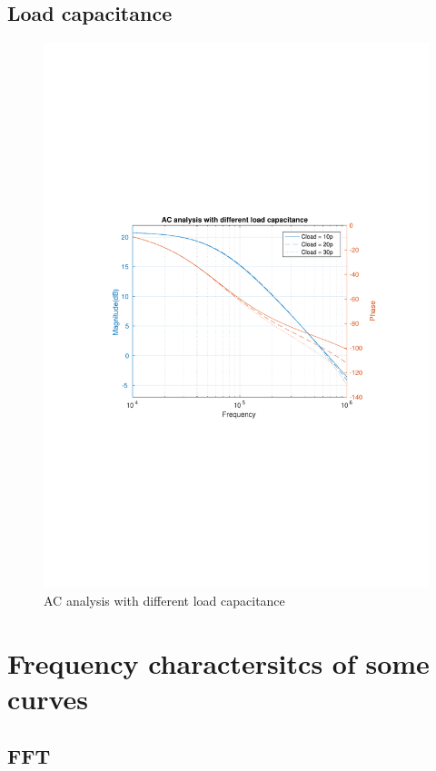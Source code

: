 \documentclass[12pt,a4paper,UKenglish]{article}
\begin{document}
\subsection{Load capacitance }
\begin{figure} [htbp]
  \centering 
  \includegraphics[width=\textwidth]{img/1d.pdf} 
  \caption{AC analysis with different load capacitance}
  \label{ac_cload} 
\end{figure}

\section{Frequency charactersitcs of some curves}
\subsection{FFT}
\end{document}
